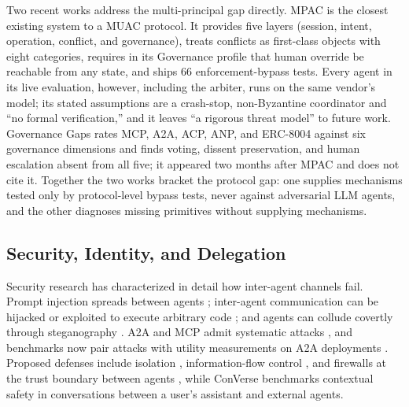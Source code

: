 \documentclass[conference]{IEEEtran}
\begin{document}
Two recent works address the multi-principal gap directly. MPAC \cite{qian2026mpac} is the closest existing system to a MUAC protocol. It provides five layers (session, intent, operation, conflict, and governance), treats conflicts as first-class objects with eight categories, requires in its Governance profile that human override be reachable from any state, and ships 66 enforcement-bypass tests. Every agent in its live evaluation, however, including the arbiter, runs on the same vendor's model; its stated assumptions are a crash-stop, non-Byzantine coordinator and ``no formal verification,'' and it leaves ``a rigorous threat model'' to future work. Governance Gaps \cite{kang2026governance} rates MCP, A2A, ACP, ANP, and ERC-8004 against six governance dimensions and finds voting, dissent preservation, and human escalation absent from all five; it appeared two months after MPAC and does not cite it. Together the two works bracket the protocol gap: one supplies mechanisms tested only by protocol-level bypass tests, never against adversarial LLM agents, and the other diagnoses missing primitives without supplying mechanisms.

\subsection{Security, Identity, and Delegation}\label{sec-6-5}

Security research has characterized in detail how inter-agent channels fail. Prompt injection spreads between agents \cite{lee2024prompt, an2026aciarena}; inter-agent communication can be hijacked \cite{he2025aitm} or exploited to execute arbitrary code \cite{triedman2025masmalicious}; and agents can collude covertly through steganography \cite{motwani2024collusion}. A2A and MCP admit systematic attacks \cite{lotfi2026a2abreak, anbiaee2026threat, hou2026mcp, louck2026a2a}, and benchmarks now pair attacks with utility measurements on A2A deployments \cite{li2026a2asecbench}. Proposed defenses include isolation \cite{wu2025isolategpt, bagdasarian2024airgapagent}, information-flow control \cite{debenedetti2026camel}, and firewalls at the trust boundary between agents \cite{abdelnabi2026firewalls}, while ConVerse \cite{gomaa2025converse} benchmarks contextual safety in conversations between a user's assistant and external agents.
\end{document}
